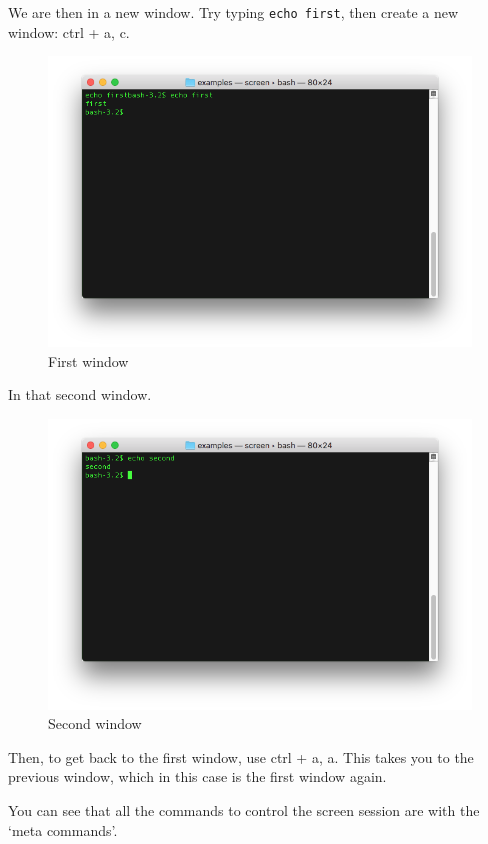 We are then in a new window. Try typing {\tt echo first}, then create a new window: ctrl + a, c.

\begin{figure}
		\includegraphics[scale=0.6]{shell/screen2.png} 
		\caption{First window}
		\label{screen2}
\end{figure}

In that second window.

\begin{figure}
		\includegraphics[scale=0.6]{shell/screen3.png} 
		\caption{Second window}
		\label{screen3}
\end{figure}

Then, to get back to the first window, use ctrl + a, a. This takes you to the previous window, which
in this case is the first window again.

You can see that all the commands to control the screen session are with the `meta commands'.

